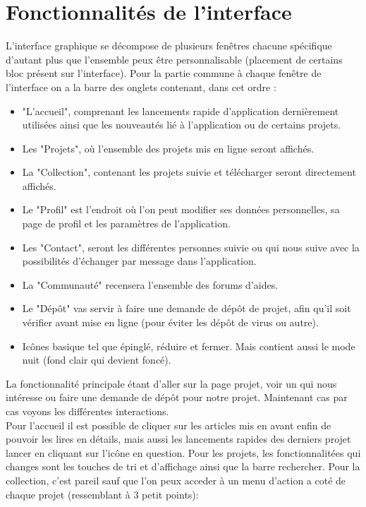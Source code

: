 \documentclass{report}
\begin{document}
\section{Fonctionnalités de l'interface}
L'interface graphique se décompose de plusieurs fenêtres chacune spécifique d'autant plus que l'ensemble peux être personnalisable (placement de certains bloc présent sur l'interface). Pour la partie commune à chaque fenêtre de l'interface
on a la barre des onglets contenant, dans cet ordre :
\vspace{0.5cm}
\begin{itemize}
    \item "L'accueil", comprenant les lancements rapide d'application dernièrement utilisées ainsi que les nouveautés lié à l'application ou de certains projets.
    \item Les "Projets", où l'ensemble des projets mis en ligne seront affichés. 
    \item La "Collection", contenant les projets suivie et télécharger seront directement affichés.
    \item Le "Profil" est l'endroit où l'on peut modifier ses données personnelles, sa page de profil et les paramètres de l'application.
    \item Les "Contact", seront les différentes personnes suivie ou qui nous suive avec la possibilités d'échanger par message dans l'application.
    \item La "Communauté" recensera l'ensemble des forums d'aides.
    \item Le "Dépôt" vas servir à faire une demande de dépôt de projet, afin qu'il soit vérifier avant mise en ligne (pour éviter les dépôt de virus ou autre).
    \item Icônes basique tel que épinglé, réduire et fermer. Mais contient aussi le mode nuit (fond clair qui devient foncé).
\end{itemize}
\vspace{0.5cm}
La fonctionnalité principale étant d'aller sur la page projet, voir un qui nous intéresse ou faire une demande de dépôt pour notre projet. Maintenant cas par cas voyons les différentes interactions.\\
Pour l'accueil il est possible de cliquer sur les articles mis en avant enfin de pouvoir les lires en détails, mais aussi les lancements rapides des derniers projet lancer en cliquant sur l'icône en question. Pour les projets, les fonctionnalitées qui changes sont les touches de tri et d'affichage ainsi que la barre rechercher. Pour la collection, c'est pareil sauf que l'on peux acceder à un menu d'action a coté de chaque projet (ressemblant à 3 petit points):
\end{document}
